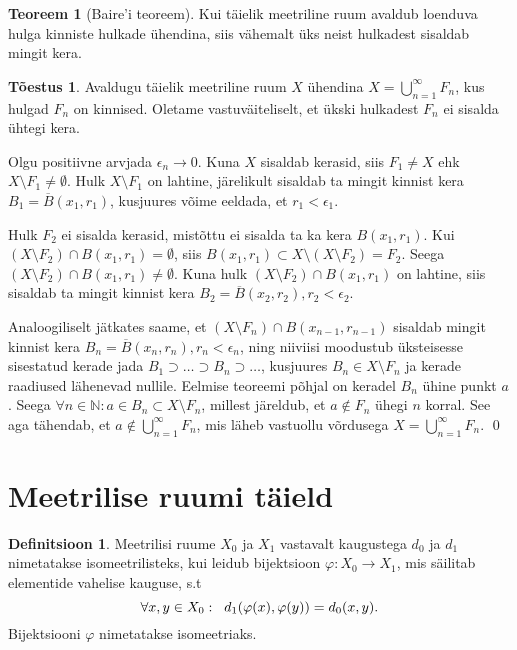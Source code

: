 \documentclass{article}[12pt]
\newcommand{\h}{\hspace{0.2cm}}
\newcommand{\N}{\mathbb{N}}
\theoremstyle{definition}
\newtheorem{definition}{Definitsioon}[section]
\theoremstyle{definition}
\newtheorem{theorem}{Teoreem}[section]
\theoremstyle{definition}
\theoremstyle{break}
\newtheorem*{toestus}{Tõestus}
\begin{document}
\begin{theorem}[Baire'i teoreem]
	Kui täielik meetriline ruum avaldub loenduva hulga kinniste hulkade ühendina, siis vähemalt üks neist hulkadest sisaldab mingit kera.
\end{theorem}
\begin{toestus}
	Avaldugu täielik meetriline ruum $X$ ühendina $X=\bigcup_{n=1}^\infty F_n$, kus hulgad $F_n$ on kinnised. Oletame vastuväiteliselt, et ükski hulkadest $F_n$ ei sisalda ühtegi kera.

	Olgu positiivne arvjada $\epsilon_n \rightarrow 0$. Kuna $X$ sisaldab kerasid, siis $F_1\neq X$ ehk $X\setminus F_1\neq \emptyset$. Hulk $X\setminus F_1$ on lahtine, järelikult sisaldab ta mingit kinnist kera $B_1 = \overline{B}(x_1,r_1)$, kusjuures võime eeldada, et $r_1 < \epsilon_1$.

	Hulk $F_2$ ei sisalda kerasid, mistõttu ei sisalda ta ka kera $B(x_1,r_1)$. Kui $(X\setminus F_2)\cap B(x_1,r_1) = \emptyset$, siis $B(x_1,r_1)\subset X\setminus(X\setminus F_2) = F_2$. Seega $(X\setminus F_2)\cap B(x_1,r_1)\neq \emptyset$. Kuna hulk $(X\setminus F_2)\cap B(x_1,r_1)$ on lahtine, siis sisaldab ta mingit kinnist kera $B_2 = \overline{B}(x_2,r_2), r_2 < \epsilon_2$.

	Analoogiliselt jätkates saame, et $(X\setminus F_n)\cap B(x_{n-1},r_{n-1})$ sisaldab mingit kinnist kera $B_n = \overline{B}(x_n,r_n),r_n < \epsilon_n$, ning niiviisi moodustub üksteisesse sisestatud kerade jada $B_1\supset \dots\supset B_n\supset \dots$, kusjuures $B_n\in X\setminus F_n$ ja kerade raadiused lähenevad nullile. Eelmise teoreemi põhjal on keradel $B_n$ ühine punkt $a$. Seega $\forall n\in\N: a\in B_n\subset X\setminus F_n$, millest järeldub, et $a\notin F_n$ ühegi $n$ korral. See aga tähendab, et $a\notin \bigcup_{n=1}^\infty F_n$, mis läheb vastuollu võrdusega $X=\bigcup_{n=1}^\infty F_n$.
	\qed
\end{toestus}

\section{Meetrilise ruumi täield}

\begin{definition}
	Meetrilisi ruume $X_0$ ja $X_1$ vastavalt kaugustega $d_0$ ja $d_1$ nimetatakse isomeetrilisteks, kui leidub bijektsioon $\varphi : X_0\rightarrow X_1$, mis säilitab elementide vahelise kauguse, s.t
	\[
		\forall x,y\in X_0: \h d_1(\varphi(x),\varphi(y)) = d_0(x,y).
	\]
	Bijektsiooni $\varphi$ nimetatakse isomeetriaks.
\end{definition}
\end{document}
